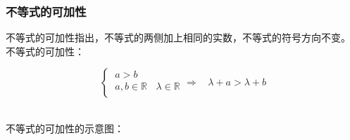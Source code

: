 \documentclass[UTF8]{ctexart}
\begin{document}
\subsubsection{不等式的可加性}
    \setcounter{equation}{0}
    不等式的可加性指出，不等式的两侧加上相同的实数，不等式的符号方向不变。\\[3mm]
    不等式的可加性：
    \begin{large}
        \begin{equation*}
            \begin{cases}
                ~a>b\\[3mm]
                ~a,b\in\mathbb{R}~~~~\lambda\in\mathbb{R}\\
            \end{cases}
            \Longrightarrow~~~~\lambda+a>\lambda+b
        \end{equation*}
    \end{large}\\[3mm]
    不等式的可加性的示意图：
\end{document}
